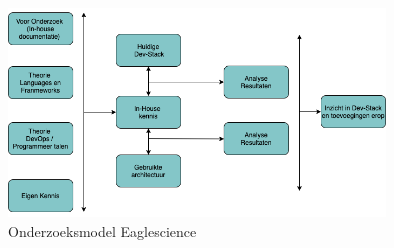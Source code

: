 \begin{figure}[htbp]
    \myfloatalign
    \includegraphics[width=10cm]{gfx/OnderzoeksmodelES}
    \caption{Onderzoeksmodel Eaglescience}
    \label{fig:OnderzoeksModelEaglescience}
\end{figure}


\newpage %



